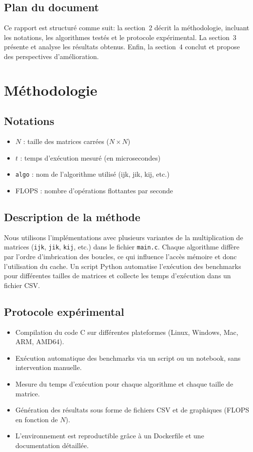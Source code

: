 \documentclass[a4paper,12pt]{article}
\begin{document}
\subsection*{Plan du document}
Ce rapport est structuré comme suit: la section~2 décrit la méthodologie, 
incluant les notations, les algorithmes testés et le protocole expérimental. 
La section~3 présente et analyse les résultats obtenus. 
Enfin, la section~4 conclut et propose des perspectives d'amélioration.

\section{Méthodologie}

\subsection*{Notations}
\begin{itemize}
    \item \(N\) : taille des matrices carrées (\(N \times N\))
    \item \(t\) : temps d'exécution mesuré (en microsecondes)
    \item \texttt{algo} : nom de l'algorithme utilisé (ijk, jik, kij, etc.)
    \item FLOPS : nombre d'opérations flottantes par seconde
\end{itemize}

\subsection*{Description de la méthode}
Nous utilisons l'implémentations avec plusieurs variantes de la multiplication de matrices 
(\texttt{ijk}, \texttt{jik}, \texttt{kij}, etc.) dans le fichier \texttt{main.c}. 
Chaque algorithme diffère par l'ordre d'imbrication des boucles, 
ce qui influence l'accès mémoire et donc l'utilisation du cache. 
Un script Python automatise l'exécution des benchmarks pour différentes 
tailles de matrices et collecte les temps d'exécution dans un fichier CSV.

\subsection*{Protocole expérimental}
\begin{itemize}
    \item Compilation du code C sur différentes plateformes (Linux, Windows, Mac, ARM, AMD64).
    \item Exécution automatique des benchmarks via un script ou un notebook, sans intervention manuelle.
    \item Mesure du temps d'exécution pour chaque algorithme et chaque taille de matrice.
    \item Génération des résultats sous forme de fichiers CSV et de graphiques (FLOPS en fonction de \(N\)).
    \item L'environnement est reproductible grâce à un Dockerfile et une documentation détaillée.
\end{itemize}
\end{document}
